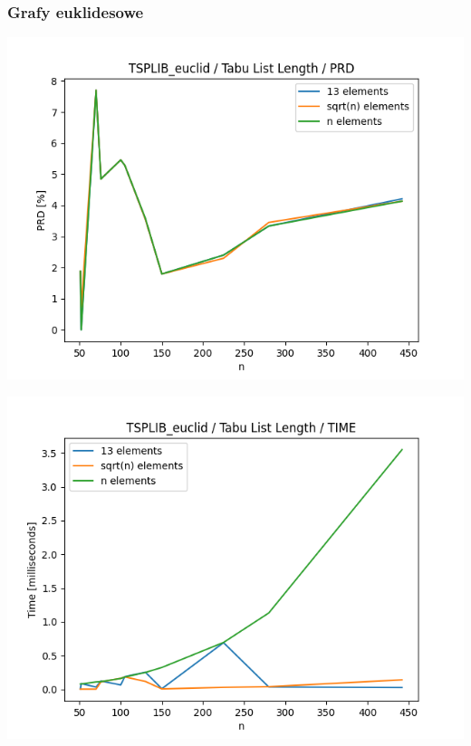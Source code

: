\documentclass{article}
\begin{document}
\subsubsection{Grafy euklidesowe}

\begin{center}
\includegraphics[width=\textwidth, 
                   height = 0.4\textheight, 
                   keepaspectratio]
                  {plots/tabu_tsplib_euclid_prd} 
\end{center}

\begin{center}
\includegraphics[width=\textwidth, 
                   height = 0.4\textheight, 
                   keepaspectratio]
                  {plots/tabu_tsplib_euclid_time} 
\end{center}
\end{document}
